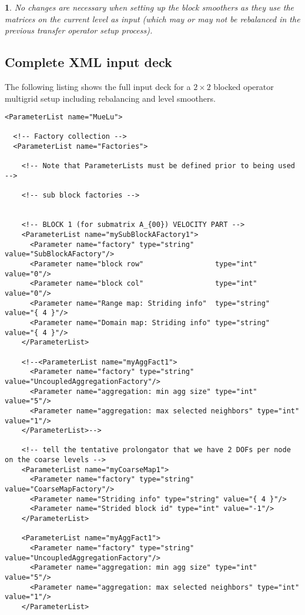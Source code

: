 \documentclass[10pt,fleqn]{book}
\newtheorem*{mycomment}{\ding{42}}
\begin{document}
\begin{mycomment}
No changes are necessary when setting up the block smoothers as they use the matrices on the current level as input (which may or may not be rebalanced in the previous transfer operator setup process).
\end{mycomment}

\subsection{Complete XML input deck}

The following listing shows the full input deck for a $2\times 2$ blocked operator multigrid setup including rebalancing and level smoothers.

\label{sec:xmlinputdeckrebalancing}

\begin{lstlisting}
<ParameterList name="MueLu">

  <!-- Factory collection -->
  <ParameterList name="Factories">

    <!-- Note that ParameterLists must be defined prior to being used -->

    <!-- sub block factories -->


    <!-- BLOCK 1 (for submatrix A_{00}) VELOCITY PART -->
    <ParameterList name="mySubBlockAFactory1">
      <Parameter name="factory" type="string" value="SubBlockAFactory"/>
      <Parameter name="block row"                 type="int"     value="0"/>
      <Parameter name="block col"                 type="int"     value="0"/>
      <Parameter name="Range map: Striding info"  type="string"  value="{ 4 }"/>
      <Parameter name="Domain map: Striding info" type="string"  value="{ 4 }"/>
    </ParameterList>

    <!--<ParameterList name="myAggFact1">
      <Parameter name="factory" type="string" value="UncoupledAggregationFactory"/>
      <Parameter name="aggregation: min agg size" type="int" value="5"/>
      <Parameter name="aggregation: max selected neighbors" type="int" value="1"/>
    </ParameterList>-->

    <!-- tell the tentative prolongator that we have 2 DOFs per node on the coarse levels -->
    <ParameterList name="myCoarseMap1">
      <Parameter name="factory" type="string" value="CoarseMapFactory"/>
      <Parameter name="Striding info" type="string" value="{ 4 }"/>
      <Parameter name="Strided block id" type="int" value="-1"/>
    </ParameterList>

    <ParameterList name="myAggFact1">
      <Parameter name="factory" type="string" value="UncoupledAggregationFactory"/>
      <Parameter name="aggregation: min agg size" type="int" value="5"/>
      <Parameter name="aggregation: max selected neighbors" type="int" value="1"/>
    </ParameterList>


\end{lstlisting}
\end{document}
